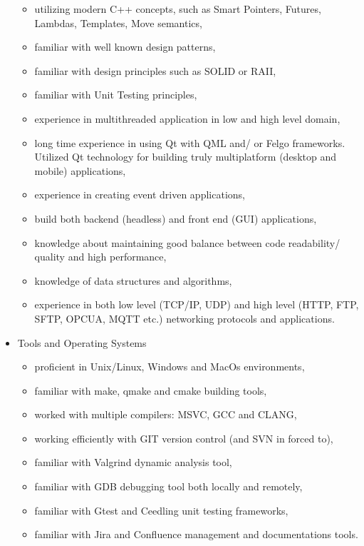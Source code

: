 \documentclass{tccv}
\begin{document}
\begin{itemize}
\begin{itemize}
			\item utilizing modern C++ concepts, such as Smart Pointers, Futures, Lambdas, Templates, Move semantics,
			\item familiar with well known design patterns,
			\item familiar with design principles such as SOLID or RAII,
			\item familiar with Unit Testing principles,
			\item experience in multithreaded application in low and high level domain,
			\item long time experience in using Qt with QML and/ or Felgo frameworks. Utilized Qt technology for building truly multiplatform (desktop and mobile) applications,
			\item experience in creating event driven applications,
			\item build both backend (headless) and front end (GUI) applications,
			\item knowledge about maintaining good balance between code readability/ quality and high performance,
			\item knowledge of data structures and algorithms,
			\item experience in both low level (TCP/IP, UDP) and high level (HTTP, FTP, SFTP, OPCUA, MQTT etc.) networking protocols and applications.
		\end{itemize}
	\item Tools and Operating Systems
		\begin{itemize}
			\item proficient in Unix/Linux, Windows and MacOs environments,
			\item familiar with make, qmake and cmake building tools,
			\item worked with multiple compilers: MSVC, GCC and CLANG,
			\item working efficiently with GIT version control (and SVN in forced to),
			\item familiar with Valgrind dynamic analysis tool,
			\item familiar with GDB debugging tool both locally and remotely,		
			\item familiar with Gtest and Ceedling unit testing frameworks, 	
			\item familiar with Jira and Confluence management and documentations tools.		
			
		\end{itemize}
\end{itemize}
\end{document}
